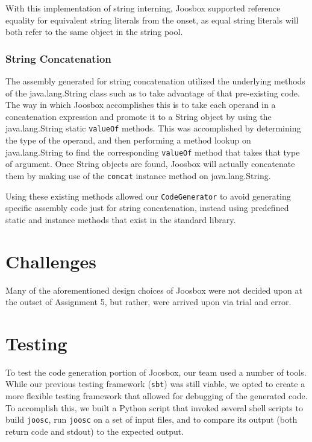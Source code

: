 \documentclass[letterpaper]{article}
\begin{document}
  With this implementation of string interning, Joosbox supported reference
  equality for equivalent string literals from the onset, as equal string literals
  will both refer to the same object in the string pool.

  \subsubsection{String Concatenation}

  The assembly generated for string concatenation utilized the underlying
  methods of the java.lang.String class such as to take advantage of that
  pre-existing code. The way in which Joosbox accomplishes this is to take each
  operand in a concatenation expression and promote it to a String object by
  using the java.lang.String static {\tt valueOf} methods. This was accomplished
  by determining the type of the operand, and then performing a method lookup on
  java.lang.String to find the corresponding {\tt valueOf} method that takes
  that type of argument. Once String objects are found, Joosbox will actually
  concatenate them by making use of the {\tt concat} instance
  method on java.lang.String.

  Using these existing methods allowed our {\tt CodeGenerator} to avoid
  generating specific assembly code just for string concatenation, instead
  using predefined static and instance methods that exist in the standard
  library.

  \section{Challenges}

  Many of the aforementioned design choices of Joosbox were not decided upon
  at the outset of Assignment 5, but rather, were arrived upon via trial and
  error.

  \section{Testing}

  To test the code generation portion of Joosbox, our team used a number of
  tools. While our previous testing framework ({\tt sbt}) was still viable, we
  opted to create a more flexible testing framework that allowed for debugging
  of the generated code. To accomplish this, we built a Python script that
  invoked several shell scripts to build {\tt joosc}, run {\tt joosc} on a set
  of input files, and to compare its output (both return code and stdout) to
  the expected output.
\end{document}

